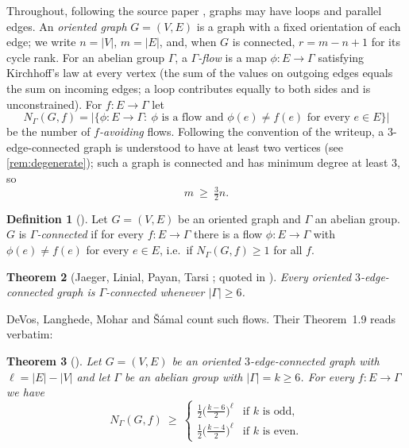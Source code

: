 \documentclass[11pt,a4paper]{article}
\theoremstyle{plain}
\newtheorem{theorem}{Theorem}[section]
\theoremstyle{definition}
\newtheorem{definition}[theorem]{Definition}
\theoremstyle{remark}
\newcommand{\Nf}{N}
\begin{document}
Throughout, following the source paper \cite{DLMS20}, graphs may have loops and parallel edges. An \emph{oriented graph} $G=(V,E)$ is a graph with a fixed orientation of each edge; we write $n=|V|$, $m=|E|$, and, when $G$ is connected, $r=m-n+1$ for its cycle rank. For an abelian group $\Gamma$, a \emph{$\Gamma$-flow} is a map $\phi\colon E\to\Gamma$ satisfying Kirchhoff's law at every vertex (the sum of the values on outgoing edges equals the sum on incoming edges; a loop contributes equally to both sides and is unconstrained). For $f\colon E\to\Gamma$ let
\[
 \Nf_\Gamma(G,f)=\bigl|\{\phi\colon E\to\Gamma:\ \phi\text{ is a flow and }\phi(e)\ne f(e)\text{ for every }e\in E\}\bigr|
\]
be the number of \emph{$f$-avoiding} flows. Following the convention of the writeup, a $3$-edge-connected graph is understood to have at least two vertices (see \cref{rem:degenerate}); such a graph is connected and has minimum degree at least $3$, so
\begin{equation}\label{eq:m32n}
 m\ \ge\ \tfrac32 n .
\end{equation}

\begin{definition}[{\cite[Definition~1.8]{DLMS20}}]
Let $G=(V,E)$ be an oriented graph and $\Gamma$ an abelian group. $G$ is \emph{$\Gamma$-connected} if for every $f\colon E\to\Gamma$ there is a flow $\phi\colon E\to\Gamma$ with $\phi(e)\ne f(e)$ for every $e\in E$, i.e.\ if $\Nf_\Gamma(G,f)\ge1$ for all $f$.
\end{definition}

\begin{theorem}[Jaeger, Linial, Payan, Tarsi {\cite{JLPT92}}; quoted in {\cite{DLMS20}}]\label{thm:JLPT}
Every oriented $3$-edge-connected graph is $\Gamma$-connected whenever $|\Gamma|\ge6$.
\end{theorem}

DeVos, Langhede, Mohar and Šámal count such flows. Their Theorem~1.9 reads verbatim:

\begin{theorem}[{\cite[Theorem~1.9]{DLMS20}}]\label{thm:19}
Let $G=(V,E)$ be an oriented $3$-edge-connected graph with $\ell=|E|-|V|$ and let $\Gamma$ be an abelian group with $|\Gamma|=k\ge6$. For every $f\colon E\to\Gamma$ we have
\[
 \Nf_\Gamma(G,f)\ \ge\ \begin{cases}\tfrac12\bigl(\tfrac{k-6}{2}\bigr)^{\ell} & \text{if $k$ is odd},\\[2pt] \tfrac12\bigl(\tfrac{k-4}{2}\bigr)^{\ell} & \text{if $k$ is even}.\end{cases}
\]
\end{theorem}
\end{document}
